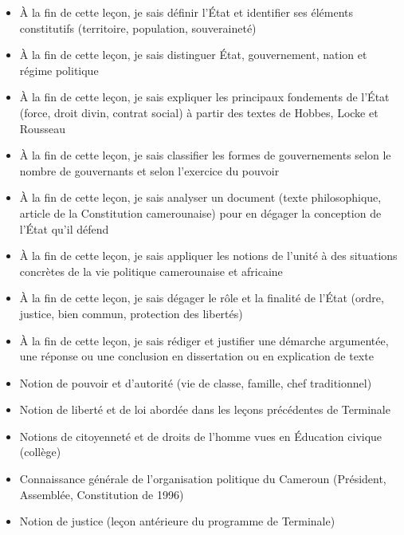 \documentclass[11pt]{article}
\begin{document}
\begin{objectifs}
\begin{itemize}
\item À la fin de cette leçon, je sais définir l'État et identifier ses éléments constitutifs (territoire, population, souveraineté)
\item À la fin de cette leçon, je sais distinguer État, gouvernement, nation et régime politique
\item À la fin de cette leçon, je sais expliquer les principaux fondements de l'État (force, droit divin, contrat social) à partir des textes de Hobbes, Locke et Rousseau
\item À la fin de cette leçon, je sais classifier les formes de gouvernements selon le nombre de gouvernants et selon l'exercice du pouvoir
\item À la fin de cette leçon, je sais analyser un document (texte philosophique, article de la Constitution camerounaise) pour en dégager la conception de l'État qu'il défend
\item À la fin de cette leçon, je sais appliquer les notions de l'unité à des situations concrètes de la vie politique camerounaise et africaine
\item À la fin de cette leçon, je sais dégager le rôle et la finalité de l'État (ordre, justice, bien commun, protection des libertés)
\item À la fin de cette leçon, je sais rédiger et justifier une démarche argumentée, une réponse ou une conclusion en dissertation ou en explication de texte
\end{itemize}
\end{objectifs}

\begin{prerequis}
\begin{itemize}
\item Notion de pouvoir et d'autorité (vie de classe, famille, chef traditionnel)
\item Notion de liberté et de loi abordée dans les leçons précédentes de Terminale
\item Notions de citoyenneté et de droits de l'homme vues en Éducation civique (collège)
\item Connaissance générale de l'organisation politique du Cameroun (Président, Assemblée, Constitution de 1996)
\item Notion de justice (leçon antérieure du programme de Terminale)
\end{itemize}
\end{prerequis}
\end{document}

